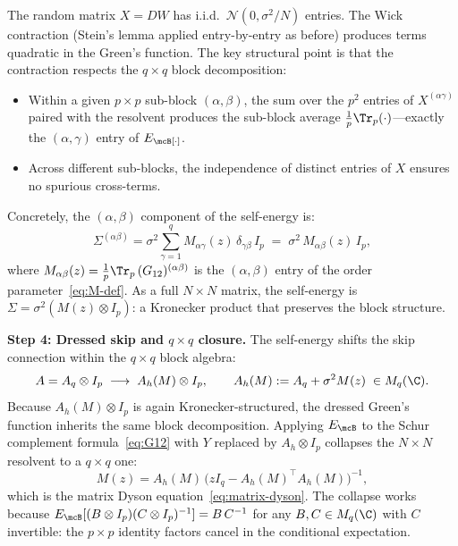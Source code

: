 The random matrix $X = DW$ has i.i.d.\ $\mathcal{N}(0,\sigma^2/N)$ entries. The Wick contraction (Stein's lemma applied entry-by-entry as before) produces terms quadratic in the Green's function. The key structural point is that the contraction respects the $q \times q$ block decomposition:
\begin{itemize}
\item Within a given $p \times p$ sub-block $(\alpha,\beta)$, the sum over the $p^2$ entries of $X^{(\alpha\gamma)}$ paired with the resolvent produces the sub-block average $\frac{1}{p}\Tr_p(\cdot)$---exactly the $(\alpha,\gamma)$ entry of $E_\mcB[\cdot]$.
\item Across different sub-blocks, the independence of distinct entries of $X$ ensures no spurious cross-terms.
\end{itemize}
Concretely, the $(\alpha,\beta)$ component of the self-energy is:
\begin{equation}\label{eq:ov-wick}
\Sigma^{(\alpha\beta)} = \sigma^2 \sum_{\gamma=1}^q M_{\alpha\gamma}(z)\,\delta_{\gamma\beta}\, I_p
\;=\; \sigma^2\, M_{\alpha\beta}(z)\, I_p,
\end{equation}
where $M_{\alpha\beta}(z) = \frac{1}{p}\Tr_p\,(G_{12})^{(\alpha\beta)}$ is the $(\alpha,\beta)$ entry of the order parameter~\eqref{eq:M-def}. As a full $N \times N$ matrix, the self-energy is $\Sigma = \sigma^2(M(z) \otimes I_p)$: a Kronecker product that preserves the block structure.

\medskip
\noindent\textbf{Step 4: Dressed skip and $q \times q$ closure.}
The self-energy shifts the skip connection within the $q \times q$ block algebra:
\begin{equation}\label{eq:dressed-skip-ov}
A = A_q \otimes I_p \;\longrightarrow\; A_h(M) \otimes I_p, \qquad A_h(M) := A_q + \sigma^2 M(z) \;\in M_q(\C).
\end{equation}
Because $A_h(M) \otimes I_p$ is again Kronecker-structured, the dressed Green's function inherits the same block decomposition. Applying $E_\mcB$ to the Schur complement formula~\eqref{eq:G12} with $Y$ replaced by $A_h \otimes I_p$ collapses the $N \times N$ resolvent to a $q \times q$ one:
\begin{equation}\label{eq:kronecker-collapse-final}
M(z) = A_h(M)\,\bigl(zI_q - A_h(M)^\top A_h(M)\bigr)^{-1},
\end{equation}
which is the matrix Dyson equation~\eqref{eq:matrix-dyson}. The collapse works because $E_\mcB[(B \otimes I_p)(C \otimes I_p)^{-1}] = B\,C^{-1}$ for any $B, C \in M_q(\C)$ with $C$ invertible: the $p \times p$ identity factors cancel in the conditional expectation.

